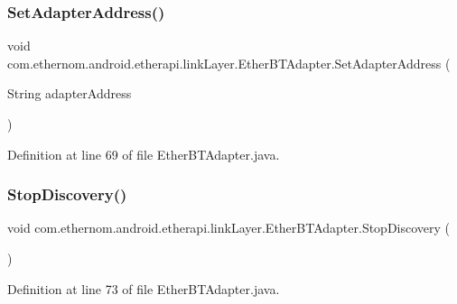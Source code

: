 \subsubsection{\texorpdfstring{Set\+Adapter\+Address()}{SetAdapterAddress()}}
{\footnotesize\ttfamily void com.\+ethernom.\+android.\+etherapi.\+link\+Layer.\+Ether\+B\+T\+Adapter.\+Set\+Adapter\+Address (\begin{DoxyParamCaption}\item[{String}]{adapter\+Address }\end{DoxyParamCaption})}



Definition at line 69 of file Ether\+B\+T\+Adapter.\+java.

\mbox{\label{classcom_1_1ethernom_1_1android_1_1etherapi_1_1link_layer_1_1_ether_b_t_adapter_afb99b565d023488ead67d41e7615b9b8}} 
\subsubsection{\texorpdfstring{Stop\+Discovery()}{StopDiscovery()}}
{\footnotesize\ttfamily void com.\+ethernom.\+android.\+etherapi.\+link\+Layer.\+Ether\+B\+T\+Adapter.\+Stop\+Discovery (\begin{DoxyParamCaption}{ }\end{DoxyParamCaption})}



Definition at line 73 of file Ether\+B\+T\+Adapter.\+java.


